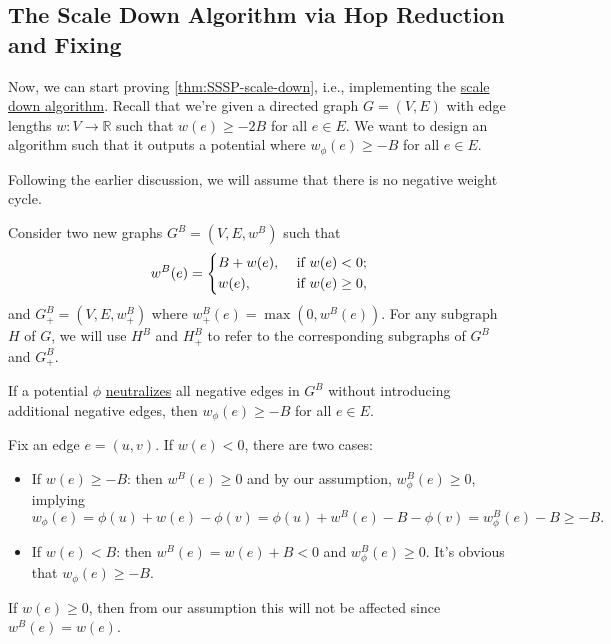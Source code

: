 \subsection{The Scale Down Algorithm via Hop Reduction and Fixing}
Now, we can start proving \autoref{thm:SSSP-scale-down}, i.e., implementing the \hyperref[algo:scale-down]{scale down algorithm}. Recall that we're given a directed graph \(G = (V, E)\) with edge lengths \(w \colon V \to \mathbb{R} \) such that \(w(e) \geq -2B\) for all \(e \in E\). We want to design an algorithm such that it outputs a potential where \(w_{\phi } (e) \geq -B\) for all \(e \in E\).

\begin{note}
	Following the earlier discussion, we will assume that there is no negative weight cycle.
\end{note}

Consider two new graphs \(G^B = (V, E, w^B)\) such that
\[
	w^B (e)
	= \begin{dcases}
		B + w(e), & \text{ if } w(e) < 0 ;    \\
		w(e),     & \text{ if } w(e) \geq 0 ,
	\end{dcases}
\]
and \(G^B_{+} = (V, E, w^B_{+})\) where \(w^B_{+} (e) = \max (0, w^B(e))\). For any subgraph \(H\) of \(G\), we will use \(H^B\) and \(H^B_{+}\) to refer to the corresponding subgraphs of \(G^B\) and \(G^B_{+}\).

\begin{claim}
	If a potential \(\phi \) \hyperref[def:neutralize]{neutralizes} all negative edges in \(G^B\) without introducing additional negative edges, then \(w_{\phi } (e) \geq -B\) for all \(e \in E\).
\end{claim}
\begin{explanation}
	Fix an edge \(e = (u, v)\). If \(w(e) < 0\), there are two cases:
	\begin{itemize}
		\item If \(w(e) \geq -B\): then \(w^B(e) \geq 0\) and by our assumption, \(w^B_{\phi }(e) \geq 0\), implying
		      \[
			      w_{\phi }(e)
			      = \phi (u) + w(e) - \phi (v)
			      = \phi (u) + w^B(e) - B - \phi (v)
			      = w_{\phi }^B(e) - B
			      \geq -B.
		      \]
		\item If \(w(e) < B\): then \(w^B(e) = w(e) + B < 0\) and \(w_{\phi }^B(e) \geq 0 \). It's obvious that \(w_{\phi }(e) \geq -B \).
	\end{itemize}
	If \(w(e) \geq 0\), then from our assumption this will not be affected since \(w^B(e) = w(e)\).
\end{explanation}


